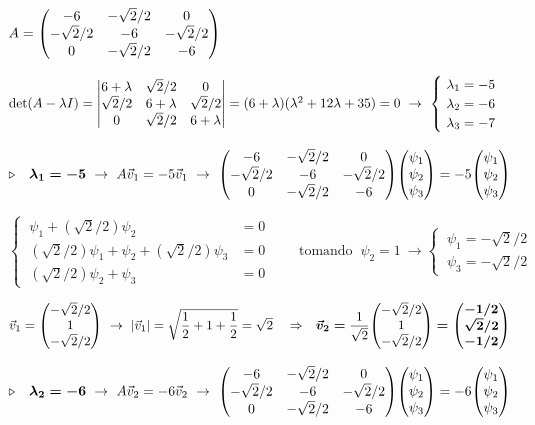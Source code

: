 $A=\mqty(-6 &-\sqrt{2}/2 &0 \\ -\sqrt{2}/2&-6&-\sqrt{2}/2 \\ 0 & -\sqrt{2}/2&-6 ) $

$ \det(A-\lambda I)= 
\mqty| 6+\lambda & \sqrt{2}/2 & 0 \\  \sqrt{2}/2 & 6+\lambda &  \sqrt{2}/2 \\ 0& \sqrt{2}/2&6+\lambda |=(6+\lambda)(\lambda^2+12\lambda+35)=0  \ \to \ \begin{cases}  \ \lambda_1=-5 \\ \ \lambda_2=-6 \\ \ \lambda_3=-7 \end{cases}$


$\triangleright \quad 	\boldsymbol{ \lambda_1=-5 } \ \to \ A \vec v_1 = -5 \vec v_1 \ \to \ \mqty(-6 &-\sqrt{2}/2 &0 \\ -\sqrt{2}/2&-6&-\sqrt{2}/2 \\ 0 & -\sqrt{2}/2&-6 ) \mqty( \psi_1 \\ \psi_2 \\ \psi_3) = -5 \mqty( \psi_1 \\ \psi_2 \\ \psi_3) $


$ \begin{cases} \ \psi_1+(\sqrt{2}/2) \psi_2 &=0 \\ \ (\sqrt{2}/2)\psi_1+\psi_2+(\sqrt{2}/2)\psi_3&=0 \\ \ (\sqrt{2}/2)\psi_2+\psi_3&=0 \end{cases} \qquad \text{tomando } \ \psi_2=1 \ \to \begin{cases} \ \psi_1=-\sqrt{2}/2 \\ \ \psi_3=-\sqrt{2}/2 \end{cases}$


$\vec v_1=\mqty(-\sqrt{2}/2 \\1\\ -\sqrt{2}/2) \ \to \ |\vec v_1|=\sqrt{\dfrac 1 2 + 1 +\dfrac 1 2}=\sqrt{2} \quad \Rightarrow \quad \boldsymbol{\vec v_2=}\dfrac{1}{\sqrt{2}} \mqty( -\sqrt{2}/2 \\ 1 \\ -\sqrt{2}/2) \boldsymbol{ =\mqty(-1/2 \\ \sqrt{2}/2 \\ -1/2) }$



$\triangleright \quad 	\boldsymbol{ \lambda_2=-6 } \ \to \ A \vec v_2 = -6 \vec v_2 \ \to \ \mqty(-6 &-\sqrt{2}/2 &0 \\ -\sqrt{2}/2&-6&-\sqrt{2}/2 \\ 0 & -\sqrt{2}/2&-6 ) \mqty( \psi_1 \\ \psi_2 \\ \psi_3) = -6 \mqty( \psi_1 \\ \psi_2 \\ \psi_3) $


